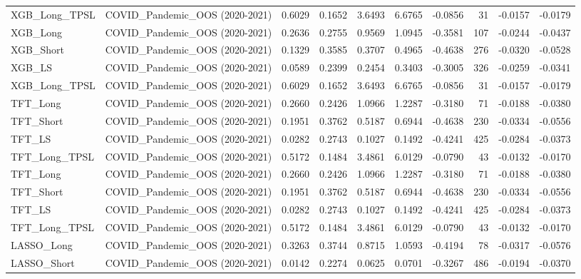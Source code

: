 \begin{tabular}{llrrrrrrrr}
\cline{1-10}
XGB\_Long\_TPSL & COVID\_Pandemic\_OOS (2020-2021) & 0.6029 & 0.1652 & 3.6493 & 6.6765 & -0.0856 & 31 & -0.0157 & -0.0179 \\
\cline{1-10}
XGB\_Long & COVID\_Pandemic\_OOS (2020-2021) & 0.2636 & 0.2755 & 0.9569 & 1.0945 & -0.3581 & 107 & -0.0244 & -0.0437 \\
\cline{1-10}
XGB\_Short & COVID\_Pandemic\_OOS (2020-2021) & 0.1329 & 0.3585 & 0.3707 & 0.4965 & -0.4638 & 276 & -0.0320 & -0.0528 \\
\cline{1-10}
XGB\_LS & COVID\_Pandemic\_OOS (2020-2021) & 0.0589 & 0.2399 & 0.2454 & 0.3403 & -0.3005 & 326 & -0.0259 & -0.0341 \\
\cline{1-10}
XGB\_Long\_TPSL & COVID\_Pandemic\_OOS (2020-2021) & 0.6029 & 0.1652 & 3.6493 & 6.6765 & -0.0856 & 31 & -0.0157 & -0.0179 \\
\cline{1-10}
TFT\_Long & COVID\_Pandemic\_OOS (2020-2021) & 0.2660 & 0.2426 & 1.0966 & 1.2287 & -0.3180 & 71 & -0.0188 & -0.0380 \\
\cline{1-10}
TFT\_Short & COVID\_Pandemic\_OOS (2020-2021) & 0.1951 & 0.3762 & 0.5187 & 0.6944 & -0.4638 & 230 & -0.0334 & -0.0556 \\
\cline{1-10}
TFT\_LS & COVID\_Pandemic\_OOS (2020-2021) & 0.0282 & 0.2743 & 0.1027 & 0.1492 & -0.4241 & 425 & -0.0284 & -0.0373 \\
\cline{1-10}
TFT\_Long\_TPSL & COVID\_Pandemic\_OOS (2020-2021) & 0.5172 & 0.1484 & 3.4861 & 6.0129 & -0.0790 & 43 & -0.0132 & -0.0170 \\
\cline{1-10}
TFT\_Long & COVID\_Pandemic\_OOS (2020-2021) & 0.2660 & 0.2426 & 1.0966 & 1.2287 & -0.3180 & 71 & -0.0188 & -0.0380 \\
\cline{1-10}
TFT\_Short & COVID\_Pandemic\_OOS (2020-2021) & 0.1951 & 0.3762 & 0.5187 & 0.6944 & -0.4638 & 230 & -0.0334 & -0.0556 \\
\cline{1-10}
TFT\_LS & COVID\_Pandemic\_OOS (2020-2021) & 0.0282 & 0.2743 & 0.1027 & 0.1492 & -0.4241 & 425 & -0.0284 & -0.0373 \\
\cline{1-10}
TFT\_Long\_TPSL & COVID\_Pandemic\_OOS (2020-2021) & 0.5172 & 0.1484 & 3.4861 & 6.0129 & -0.0790 & 43 & -0.0132 & -0.0170 \\
\cline{1-10}
LASSO\_Long & COVID\_Pandemic\_OOS (2020-2021) & 0.3263 & 0.3744 & 0.8715 & 1.0593 & -0.4194 & 78 & -0.0317 & -0.0576 \\
\cline{1-10}
LASSO\_Short & COVID\_Pandemic\_OOS (2020-2021) & 0.0142 & 0.2274 & 0.0625 & 0.0701 & -0.3267 & 486 & -0.0194 & -0.0370 \\

\end{tabular}
